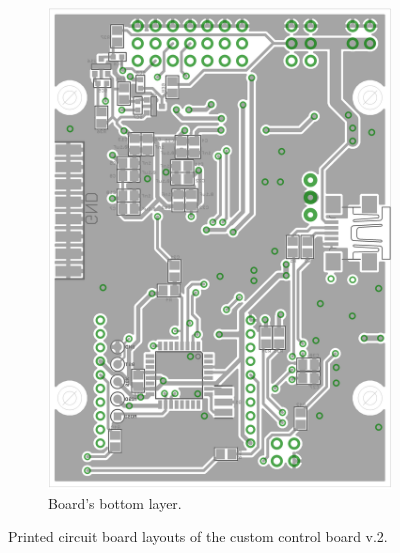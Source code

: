 \begin{figure}[H]
\begin{subfigure}[b]{0.5\textwidth}
	\includegraphics[width=\textwidth]{fig/layout_bottom.png}
	\caption{Board's bottom layer.}
	\label{fig:layout_bottom}
\end{subfigure}
\caption*{Printed circuit board layouts of the custom control board v.2.}
\end{figure}

\clearpage

